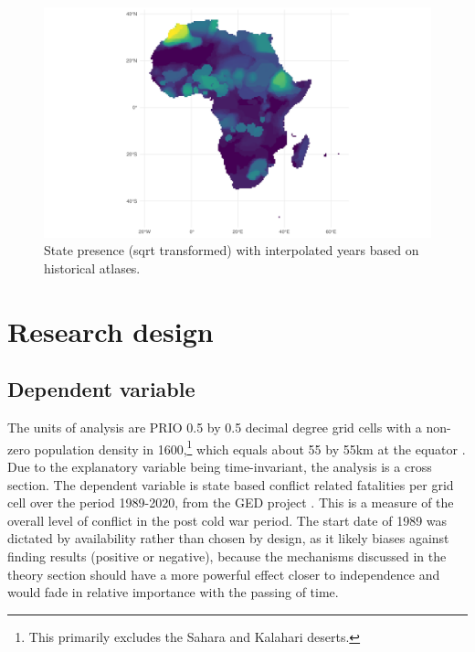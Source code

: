 \documentclass[12pt]{article}
\begin{document}

\begin{figure}[htpb]
	\centering
	\includegraphics[width=\linewidth]{../R/Output/sqrtSpAll.pdf}
	\caption{State presence (sqrt transformed) with interpolated years based
	on historical atlases.}
	\label{Sp_i}
\end{figure}


\section{Research design} \label{Research design}

\subsection{Dependent variable} \label{Dependent variable}

The units of analysis are PRIO 0.5 by 0.5 decimal degree grid cells with a
non-zero population density in 1600,\footnote{This primarily excludes the Sahara
and Kalahari deserts.} which equals about 55 by 55km at the equator
\citep{Tollefsen2012}. Due to the explanatory variable being time-invariant, the
analysis is a cross section. The dependent variable is state based conflict
related fatalities per grid cell over the period 1989-2020, from the GED project
\citep{Sundberg2013}. This is a measure of the overall level of conflict in the
post cold war period. The start date of 1989 was dictated by availability rather
than chosen by design, as it likely biases against finding results (positive or
negative), because the mechanisms discussed in the theory section should have a
more powerful effect closer to independence and would fade in relative
importance with the passing of time.
\end{document}
